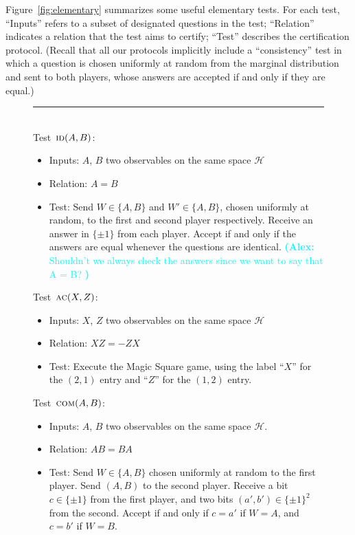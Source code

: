 \documentclass[11pt]{article}
\theoremstyle{remark}
\theoremstyle{definition}
\newcommand{\mH}{\mathcal{H}}
\newcommand{\comt}{\textsc{com}}
\newcommand{\act}{\textsc{ac}}
\newcommand{\idt}{\textsc{id}}
\newcommand{\agnote}[1]{\textcolor{cyan}{\small {\textbf{(Alex:} #1 \textbf{) }}}}
\begin{document}
Figure~\ref{fig:elementary} summarizes some useful elementary tests. For each test, ``Inputs'' refers to a subset of designated questions in the test; ``Relation'' indicates a relation that the test aims to certify; ``Test'' describes the certification protocol. (Recall that all our protocols implicitly include a ``consistency'' test in which a question is chosen uniformly at random from the marginal distribution and sent to both players, whose answers are accepted if and only if they are equal.)

\begin{figure}[H]
\rule[1ex]{16.5cm}{0.5pt}\\
Test~$\idt(A,B)$:
\begin{itemize}
    \item Inputs: $A$, $B$ two observables on the same space $\mH$
    \item Relation: $A=B$
    \item Test: Send $W \in \{A,B\}$ and $W'\in\{A,B\}$, chosen uniformly at random, to the first and second player respectively. Receive an answer in $\{\pm 1\}$ from each player. Accept if and only if the answers are equal whenever the questions are identical. \agnote{Shouldn't we always check the answers since we want to say that A = B?}
\end{itemize}
Test~$\act(X,Z)$:
\begin{itemize}
    \item Inputs: $X$, $Z$ two observables on the same space $\mH$
    \item Relation: $XZ=-ZX$
    \item Test: Execute the Magic Square game, using the label ``$X$'' for the $(2,1)$ entry and ``$Z$'' for the $(1,2)$ entry.  
\end{itemize}
Test~$\comt(A,B)$:
\begin{itemize}
    \item Inputs: $A$, $B$ two observables on the same space $\mH$.
    \item Relation: $AB=BA$
    \item Test: Send $W\in\{A,B\}$ chosen uniformly at random to the first player. Send $(A,B)$ to the second player. Receive a bit $c\in\{\pm 1\}$ from the first player, and two bits $(a',b')\in\{\pm 1\}^2$ from the second. Accept if and only if $c=a'$ if $W=A$, and $c=b'$ if $W=B$. 

\end{itemize}
\end{figure}
\end{document}
